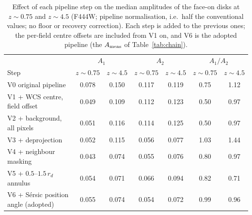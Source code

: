 \documentclass[fleqn,usenatbib]{mnras}
\begin{document}
\begin{table}
\centering
\caption{Effect of each pipeline step on the median amplitudes
of the face-on disks at $z\sim0.75$ and $z\sim4.5$ (F444W; pipeline
normalisation, i.e.\ half the conventional values; no floor or
recovery correction). Each step is added to the previous ones; the
per-field centre offsets are included from V1 on, and V6 is the adopted
pipeline (the $A_{\rm meas}$ of Table~\ref{tab:chain}).}
\label{tab:steps}
\small
\begin{tabular}{lcccccc}
\hline
{} & \multicolumn{2}{c}{$A_1$} & \multicolumn{2}{c}{$A_2$} &
\multicolumn{2}{c}{$A_1/A_2$}\\
{Step} & {$z\sim0.75$} & {$z\sim4.5$} &
{$z\sim0.75$} & {$z\sim4.5$} &
{$z\sim0.75$} & {$z\sim4.5$}
\\
\hline
V0 original pipeline & 0.078 & 0.150 & 0.117 & 0.119 & 0.75 & 1.12\\
V1 + WCS centre, field offset & 0.049 & 0.109 & 0.112 & 0.123 & 0.50 & 0.97\\
V2 + background, all pixels & 0.051 & 0.116 & 0.114 & 0.125 & 0.50 & 0.97\\
V3 + deprojection & 0.052 & 0.115 & 0.056 & 0.077 & 1.03 & 1.44\\
V4 + neighbour masking & 0.043 & 0.074 & 0.055 & 0.076 & 0.80 & 0.97\\
V5 + $0.5$--$1.5\,r_d$ annulus & 0.054 & 0.071 & 0.066 & 0.094 & 0.82 & 0.71\\
V6 + S\'ersic position angle (adopted) & 0.055 & 0.074 & 0.054 & 0.072 & 0.99 & 0.96\\
\hline
\end{tabular}
\end{table}
\end{document}
